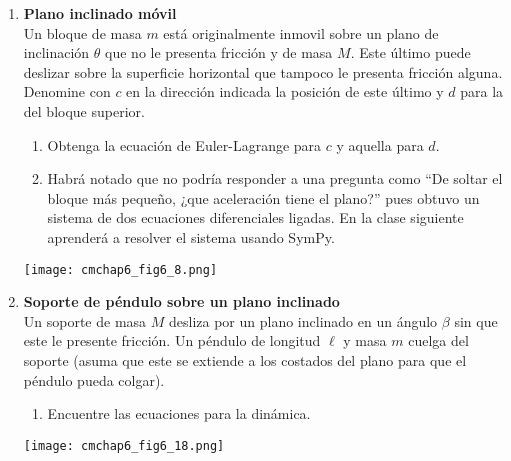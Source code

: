 \documentclass[11pt, a4paper, twoside]{article}
\begin{document}
\begin{enumerate}
\item
	\begin{minipage}[t][5.5cm]{0.7\textwidth}
		\textbf{Plano inclinado móvil}\\
		Un bloque de masa \(m\) está originalmente inmovil sobre un plano de inclinación \(\theta\) que no le presenta fricción y de masa \(M\).
		Este último puede deslizar sobre la superficie horizontal que tampoco le presenta fricción alguna.
		Denomine con \(c\) en la dirección indicada la posición de este último y \(d\) para la del bloque superior.
		\begin{enumerate}
			\item Obtenga la ecuación de Euler-Lagrange para \(c\) y aquella para \(d\).
			\item Habrá notado que no podría responder a una pregunta como 
				``De soltar el bloque más pequeño, ¿que aceleración tiene el plano?''
				pues obtuvo un sistema de dos ecuaciones diferenciales ligadas.
				En la clase siguiente aprenderá a resolver el sistema usando SymPy. 
		\end{enumerate}
	\end{minipage}
	\begin{minipage}[c][0cm][t]{0.3\textwidth}
		\texttt{[image: cmchap6\_fig6\_8.png]}
	\end{minipage}


\item
	\begin{minipage}[t][4.5cm]{0.7\textwidth}
		\textbf{Soporte de péndulo sobre un plano inclinado}\\
		Un soporte de masa \(M\) desliza por un plano inclinado en un ángulo \(\beta\) sin que este le presente fricción.
		Un péndulo de longitud \(\ell\) y masa \(m\) cuelga del soporte (asuma que este se extiende a los costados del plano para que el péndulo pueda colgar).
		\begin{enumerate}
			\item Encuentre las ecuaciones para la dinámica.
		\end{enumerate}
	\end{minipage}
	\begin{minipage}[c][0cm][t]{0.3\textwidth}
		\texttt{[image: cmchap6\_fig6\_18.png]}
	\end{minipage}




\end{enumerate}
\end{document}
